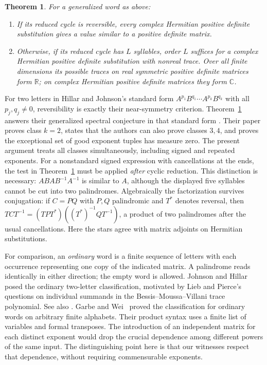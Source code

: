 \documentclass[11pt]{article}
\newtheorem{theorem}{Theorem}
\newcommand{\R}{\mathbb R}
\newcommand{\C}{\mathbb C}
\begin{document}
\begin{theorem}\label{t:general}
For a generalized word as above:
\begin{enumerate}[label=(\alph*)]
\item If its reduced cycle is reversible, every complex Hermitian positive definite substitution gives a value similar to a positive definite matrix.
\item Otherwise, if its reduced cycle has $L$ syllables, order $L$ suffices for a complex Hermitian positive definite substitution with nonreal trace. Over all finite dimensions its possible traces on real symmetric positive definite matrices form $\R$; on complex Hermitian positive definite matrices they form $\C$.
\end{enumerate}
\end{theorem}

For two letters in Hillar and Johnson's standard form $A^{p_1}B^{q_1}\cdots A^{p_k}B^{q_k}$ with all $p_j,q_j\ne0$, reversibility is exactly their near-symmetry criterion. Theorem~\ref{t:general} answers their generalized spectral conjecture in that standard form \cite[Conjecture 1.3]{HJ2}. Their paper proves class $k=2$, states that the authors can also prove classes $3,4$, and proves the exceptional set of good exponent tuples has measure zero. The present argument treats all classes simultaneously, including signed and repeated exponents. For a nonstandard signed expression with cancellations at the ends, the test in Theorem~\ref{t:general} must be applied \emph{after} cyclic reduction. This distinction is necessary: $ABAB^{-1}A^{-1}$ is similar to $A$, although the displayed five syllables cannot be cut into two palindromes. Algebraically the factorization survives conjugation: if $C=PQ$ with $P,Q$ palindromic and $T^*$ denotes reversal, then $TCT^{-1}=(TPT^*)((T^*)^{-1}QT^{-1})$, a product of two palindromes after the usual cancellations. Here the stars agree with matrix adjoints on Hermitian substitutions.

For comparison, an \emph{ordinary} word is a finite sequence of letters with each occurrence representing one copy of the indicated matrix. A palindrome reads identically in either direction; the empty word is allowed. Johnson and Hillar~\cite{HJ1} posed the ordinary two-letter classification, motivated by Lieb and Pierce's questions on individual summands in the Bessis--Moussa--Villani trace polynomial. See also \cite{HLR}. Garbe and Wei~\cite[Theorems 2.8--2.9]{GW} proved the classification for ordinary words on arbitrary finite alphabets. Their product syntax uses a finite list of variables and formal transposes. The introduction of an independent matrix for each distinct exponent would drop the crucial dependence among different powers of the same input. The distinguishing point here is that our witnesses respect that dependence, without requiring commensurable exponents.
\end{document}
